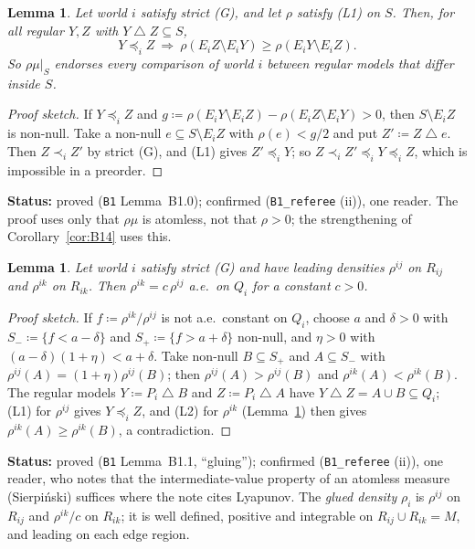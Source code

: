 \documentclass[11pt]{article}
\newtheorem{lemma}[theorem]{Lemma}
\theoremstyle{definition}
\theoremstyle{remark}
\newcommand{\sd}{\mathbin{\triangle}}
\newcommand{\src}[1]{\texttt{#1}}
\newcommand{\status}[1]{\par\smallskip\noindent\textbf{Status:} #1\par\smallskip}
\begin{document}
\begin{lemma}\label{lem:B10}
Let world $i$ satisfy strict (G), and let $\rho$ satisfy (L1) on $S$. Then, for all regular $Y,Z$ with $Y\sd Z\subseteq S$,
\[
Y\preceq_iZ\ \Longrightarrow\ \rho(E_iZ\setminus E_iY)\ge\rho(E_iY\setminus E_iZ).\tag{L2}
\]
So $\rho\mu|_S$ endorses every comparison of world $i$ between regular models that differ inside $S$.
\end{lemma}
\begin{proof}[Proof sketch]
If $Y\preceq_iZ$ and $g\coloneqq\rho(E_iY\setminus E_iZ)-\rho(E_iZ\setminus E_iY)>0$, then $S\setminus E_iZ$ is non-null. Take a non-null $e\subseteq S\setminus E_iZ$ with $\rho(e)<g/2$ and put $Z'\coloneqq Z\sd e$. Then $Z\prec_iZ'$ by strict (G), and (L1) gives $Z'\preceq_iY$; so $Z\prec_iZ'\preceq_iY\preceq_iZ$, which is impossible in a preorder.
\end{proof}
\status{proved (\src{B1} Lemma~B1.0); confirmed (\src{B1\_referee} (ii)), one reader. The proof uses only that $\rho\mu$ is atomless, not that $\rho>0$; the strengthening of Corollary~\ref{cor:B14} uses this.}

\begin{lemma}\label{lem:B11}
Let world $i$ satisfy strict (G) and have leading densities $\rho^{ij}$ on $R_{ij}$ and $\rho^{ik}$ on $R_{ik}$. Then $\rho^{ik}=c\,\rho^{ij}$ a.e.\ on $Q_i$ for a constant $c>0$.
\end{lemma}
\begin{proof}[Proof sketch]
If $f\coloneqq\rho^{ik}/\rho^{ij}$ is not a.e.\ constant on $Q_i$, choose $a$ and $\delta>0$ with $S_-\coloneqq\{f<a-\delta\}$ and $S_+\coloneqq\{f>a+\delta\}$ non-null, and $\eta>0$ with $(a-\delta)(1+\eta)<a+\delta$. Take non-null $B\subseteq S_+$ and $A\subseteq S_-$ with $\rho^{ij}(A)=(1+\eta)\rho^{ij}(B)$; then $\rho^{ij}(A)>\rho^{ij}(B)$ and $\rho^{ik}(A)<\rho^{ik}(B)$. The regular models $Y\coloneqq P_i\sd B$ and $Z\coloneqq P_i\sd A$ have $Y\sd Z=A\cup B\subseteq Q_i$; (L1) for $\rho^{ij}$ gives $Y\preceq_iZ$, and (L2) for $\rho^{ik}$ (Lemma~\ref{lem:B10}) then gives $\rho^{ik}(A)\ge\rho^{ik}(B)$, a contradiction.
\end{proof}
\status{proved (\src{B1} Lemma~B1.1, ``gluing''); confirmed (\src{B1\_referee} (ii)), one reader, who notes that the intermediate-value property of an atomless measure (Sierpi\'nski) suffices where the note cites Lyapunov. The \emph{glued density} $\rho_i$ is $\rho^{ij}$ on $R_{ij}$ and $\rho^{ik}/c$ on $R_{ik}$; it is well defined, positive and integrable on $R_{ij}\cup R_{ik}=M$, and leading on each edge region.}
\end{document}
